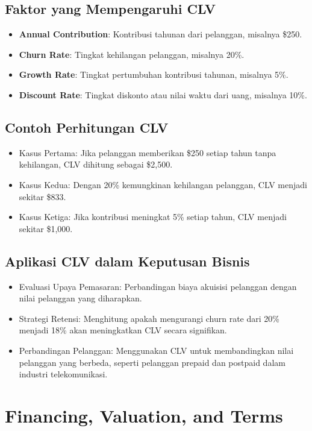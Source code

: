 \documentclass{article}
\begin{document}
\subsection{Faktor yang Mempengaruhi CLV}
\begin{itemize}
    \item \textbf{Annual Contribution}: Kontribusi tahunan dari pelanggan, misalnya \$250.
    \item \textbf{Churn Rate}: Tingkat kehilangan pelanggan, misalnya 20\%.
    \item \textbf{Growth Rate}: Tingkat pertumbuhan kontribusi tahunan, misalnya 5\%.
    \item \textbf{Discount Rate}: Tingkat diskonto atau nilai waktu dari uang, misalnya 10\%.
\end{itemize}

\subsection{Contoh Perhitungan CLV}
\begin{itemize}
    \item Kasus Pertama: Jika pelanggan memberikan \$250 setiap tahun tanpa kehilangan, CLV dihitung sebagai \$2,500.
    \item Kasus Kedua: Dengan 20\% kemungkinan kehilangan pelanggan, CLV menjadi sekitar \$833.
    \item Kasus Ketiga: Jika kontribusi meningkat 5\% setiap tahun, CLV menjadi sekitar \$1,000.
\end{itemize}

\subsection{Aplikasi CLV dalam Keputusan Bisnis}
\begin{itemize}
    \item Evaluasi Upaya Pemasaran: Perbandingan biaya akuisisi pelanggan dengan nilai pelanggan yang diharapkan.
    \item Strategi Retensi: Menghitung apakah mengurangi churn rate dari 20\% menjadi 18\% akan meningkatkan CLV secara signifikan.
    \item Perbandingan Pelanggan: Menggunakan CLV untuk membandingkan nilai pelanggan yang berbeda, seperti pelanggan prepaid dan postpaid dalam industri telekomunikasi.
\end{itemize}


\newpage

\section{Financing, Valuation, and Terms}
\end{document}
